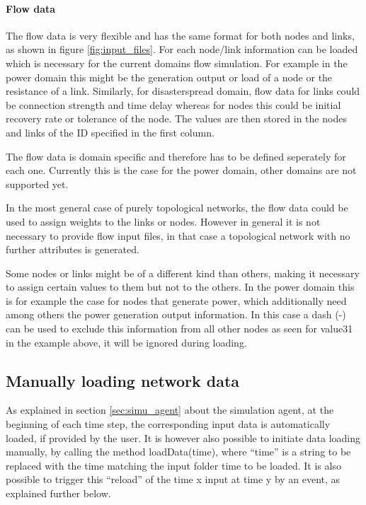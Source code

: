 \documentclass[11pt,fleqn]{book} %
\begin{document}
\paragraph{Flow data} The flow data is very flexible and has the same format for both nodes and links, as shown in figure \ref{fig:input_files}. For each node/link information can be loaded which is necessary for the current domains flow simulation. For example in the power domain this might be the generation output or load of a node or the resistance of a link. Similarly, for disaster\textunderscore spread domain, flow data for links could be connection strength and time delay whereas for nodes this could be initial recovery rate or tolerance of the node. The values are then stored in the nodes and links of the ID specified in the first column.

The flow data is domain specific and therefore has to be defined seperately for each one. Currently this is the case for the power domain, other domains are not supported yet.

In the most general case of purely topological networks, the flow data could be used to assign weights to the links or nodes. However in general it is not necessary to provide flow input files, in that case a topological network with no further attributes is generated.

Some nodes or links might be of a different kind than others, making it necessary to assign certain values to them but not to the others. In the power domain this is for example the case for nodes that generate power, which additionally need among others the power generation output information. In this case a dash (-) can be used to exclude this information from all other nodes as seen for value31 in the example above, it will be ignored during loading. 

\subsection{Manually loading network data}
As explained in section \ref{sec:simu_agent} about the simulation agent, at the beginning of each time step, the corresponding input data is automatically loaded, if provided by the user. It is however also possible to initiate data loading manually, by calling the method loadData(time), where “time” is a string to be replaced with the time matching the input folder time to be loaded. It is also possible to trigger this “reload” of the time x input at time y by an event, as explained further below.
\end{document}
